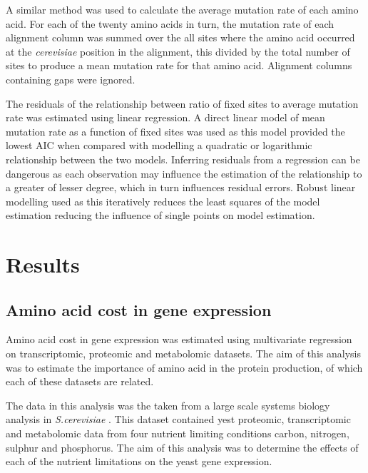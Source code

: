 A similar method was used to calculate the average mutation rate of each amino acid. For each of the twenty amino acids in turn, the mutation rate of each alignment column was summed over the all sites where the amino acid occurred at the \emph{cerevisiae} position in the alignment, this divided by the total number of sites to produce a mean mutation rate for that amino acid. Alignment columns containing gaps were ignored.


The residuals of the relationship between ratio of fixed sites to average mutation rate was estimated using linear regression. A direct linear model of mean mutation rate as a function of fixed sites was used as this model provided the lowest AIC when compared with modelling a quadratic or logarithmic relationship between the two models. Inferring residuals from a regression can be dangerous as each observation may influence the estimation of the relationship to a greater of lesser degree, which in turn influences residual errors. Robust linear modelling used as this iteratively reduces the least squares of the model estimation reducing the influence of single points on model estimation.


\clearpage

\section{Results}

\subsection{Amino acid cost in gene expression}

Amino acid cost in gene expression was estimated using multivariate regression on transcriptomic, proteomic and metabolomic datasets. The aim of this analysis was to estimate the importance of amino acid in the protein production, of which each of these datasets are related.

The data in this analysis was the taken from a large scale systems biology analysis in \emph{S.cerevisiae} \cite{castrillo2007}. This dataset contained yest proteomic, transcriptomic and metabolomic data from four nutrient limiting conditions carbon, nitrogen, sulphur and phosphorus. The aim of this analysis was to determine the effects of each of the nutrient limitations on the yeast gene expression.

